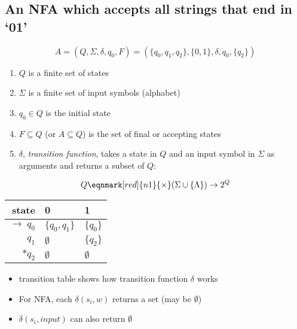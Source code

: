 \documentclass[10pt,a4paper,landscape]{article}
\begin{document}
\pagestyle{empty}

\begin{multicols*}{3}
\section*{An NFA which accepts all strings that end in `01'}
\begin{minipage}{\linewidth}
  \centering
\end{minipage}
\[
  A = (Q,\Sigma,\delta,q_{0},F) = (\{q_{0},q_{1},q_{2}\},\{0,1\},\delta,q_{0},\{q_{2}\})
\]
\begin{enumerate}
\item $Q$ is a finite set of states
\item $\Sigma$ is a finite set of input symbols (alphabet)
\item $q_{0} \in Q$ is the initial state
\item $F \subseteq Q$ (or $A \subseteq Q$) is the set of final or accepting states
\item $\delta$, \emph{transition function}, takes a state in $Q$ and an input symbol in $\Sigma$ as arguments and returns a subset of $Q$:
\end{enumerate}
\begin{equation*}
  Q \eqnmark[red]{n1}{\times} (\Sigma \cup \{\Lambda\}) \to 2^{Q}
\end{equation*}

\begin{minipage}{.5\linewidth}
  \centering
  \begin{tabular}{r||l|l}
    state & 0 & 1 \\
    \hline
    \hline
    $\to\; q_{0}$    & $\{q_{0}, q_{1}\}$ & $\{q_{0}\}$\\
    $q_{1}$          & $\emptyset$      & $\{q_{2}\}$\\
    $*q_{2}$         & $\emptyset$      & $\emptyset$
  \end{tabular}
\end{minipage}
\begin{minipage}{.5\linewidth}
  \flushleft
  \begin{itemize}
  \item transition table shows how transition function $\delta$ works
  \item For NFA, each $\delta(s_{i}, w)$ returns a set (may be $\emptyset$)
  \item $\delta(s_{i}, input)$ can also return $\emptyset$
  \end{itemize}
\end{minipage}


\end{multicols*}
\end{document}

